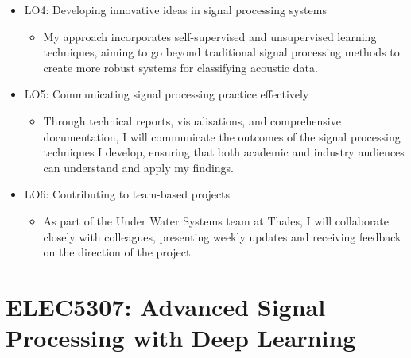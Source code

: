 \begin{itemize}
\begin{itemize}
    \end{itemize}
    \item LO4: Developing innovative ideas in signal processing systems
    \begin{itemize}
        \item My approach incorporates self-supervised and unsupervised learning techniques, aiming to go beyond traditional signal processing methods to create more robust systems for classifying acoustic data.
    \end{itemize}
    \item LO5: Communicating signal processing practice effectively
    \begin{itemize}
        \item Through technical reports, visualisations, and comprehensive documentation, I will communicate the outcomes of the signal processing techniques I develop, ensuring that both academic and industry audiences can understand and apply my findings.
    \end{itemize}
    \item LO6: Contributing to team-based projects
    \begin{itemize}
        \item As part of the Under Water Systems team at Thales, I will collaborate closely with colleagues, presenting weekly updates and receiving feedback on the direction of the project.
    \end{itemize}
\end{itemize}

\section{ELEC5307: Advanced Signal Processing with Deep Learning}

